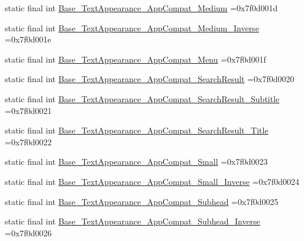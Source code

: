 \begin{DoxyCompactItemize}
\item 
static final int \mbox{\hyperlink{classcom_1_1example_1_1trainawearapplication_1_1_r_1_1style_a402ca335c9d808f773e2f3954db01904}{Base\+\_\+\+Text\+Appearance\+\_\+\+App\+Compat\+\_\+\+Medium}} =0x7f0d001d
\item 
static final int \mbox{\hyperlink{classcom_1_1example_1_1trainawearapplication_1_1_r_1_1style_a79c63be04da2ee7ab723e5a64c1b33c3}{Base\+\_\+\+Text\+Appearance\+\_\+\+App\+Compat\+\_\+\+Medium\+\_\+\+Inverse}} =0x7f0d001e
\item 
static final int \mbox{\hyperlink{classcom_1_1example_1_1trainawearapplication_1_1_r_1_1style_a250bb2ccdecf66e42ff2a00af1901f9f}{Base\+\_\+\+Text\+Appearance\+\_\+\+App\+Compat\+\_\+\+Menu}} =0x7f0d001f
\item 
static final int \mbox{\hyperlink{classcom_1_1example_1_1trainawearapplication_1_1_r_1_1style_aa6747f43616c15a5ffd8b3a8878b3b3d}{Base\+\_\+\+Text\+Appearance\+\_\+\+App\+Compat\+\_\+\+Search\+Result}} =0x7f0d0020
\item 
static final int \mbox{\hyperlink{classcom_1_1example_1_1trainawearapplication_1_1_r_1_1style_af77262ab0f65a261657f349cc6272c2a}{Base\+\_\+\+Text\+Appearance\+\_\+\+App\+Compat\+\_\+\+Search\+Result\+\_\+\+Subtitle}} =0x7f0d0021
\item 
static final int \mbox{\hyperlink{classcom_1_1example_1_1trainawearapplication_1_1_r_1_1style_af22309fd477e9e93635262b422ccca44}{Base\+\_\+\+Text\+Appearance\+\_\+\+App\+Compat\+\_\+\+Search\+Result\+\_\+\+Title}} =0x7f0d0022
\item 
static final int \mbox{\hyperlink{classcom_1_1example_1_1trainawearapplication_1_1_r_1_1style_a25290ad4a88aa88e3eda37ad944aafbb}{Base\+\_\+\+Text\+Appearance\+\_\+\+App\+Compat\+\_\+\+Small}} =0x7f0d0023
\item 
static final int \mbox{\hyperlink{classcom_1_1example_1_1trainawearapplication_1_1_r_1_1style_a37c78b5b01f0cac3175f953b2a13be7e}{Base\+\_\+\+Text\+Appearance\+\_\+\+App\+Compat\+\_\+\+Small\+\_\+\+Inverse}} =0x7f0d0024
\item 
static final int \mbox{\hyperlink{classcom_1_1example_1_1trainawearapplication_1_1_r_1_1style_a1be8605f4da63620b024f7c9685348ea}{Base\+\_\+\+Text\+Appearance\+\_\+\+App\+Compat\+\_\+\+Subhead}} =0x7f0d0025
\item 
static final int \mbox{\hyperlink{classcom_1_1example_1_1trainawearapplication_1_1_r_1_1style_a5e6e89efff30a8a12189b61a835a806d}{Base\+\_\+\+Text\+Appearance\+\_\+\+App\+Compat\+\_\+\+Subhead\+\_\+\+Inverse}} =0x7f0d0026

\end{DoxyCompactItemize}
